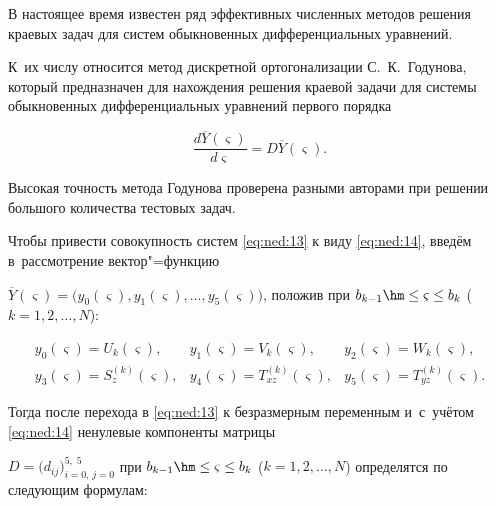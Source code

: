 \smallskip



В настоящее время известен ряд эффективных численных методов решения краевых задач для систем обыкновенных дифференциальных уравнений. 

К~их числу относится метод дискретной ортогонализации С.~К.~Годунова, который предназначен для нахождения решения краевой задачи для системы обыкновенных дифференциальных уравнений первого порядка

\begin{equation}

\frac{{d\overline Y (\varsigma)}}{{d\varsigma}}=D\overline Y(\varsigma).

\label{eq:ned:14}

\end{equation}

Высокая точность метода Годунова проверена разными авторами при решении большого количества тестовых задач.



Чтобы привести совокупность систем \eqref{eq:ned:13} к виду \eqref{eq:ned:14}, введём в~рассмотрение вектор"=функцию

$\overline Y(\varsigma)=\bigl( y_0(\varsigma), y_1(\varsigma), \dots, y_5(\varsigma) \bigr)$, положив при $b_{k-1}\hm\le\varsigma\le b_k$ ($k=1, 2, \dots, N$):

\begin{equation}

\begin{array}{lll}

y_0(\varsigma)=U_k(\varsigma),& y_1(\varsigma)=V_k(\varsigma), & y_2(\varsigma)=W_k(\varsigma),\\

y_3(\varsigma)=S_z^{(k)}(\varsigma), & y_4(\varsigma)=T_{xz}^{(k)}(\varsigma),& y_5(\varsigma)=T_{yz}^{(k)}(\varsigma).

\end{array}

\label{eq:ned:15}

\end{equation}

Тогда после перехода в \eqref{eq:ned:13} к безразмерным переменным и~с~учётом \eqref{eq:ned:14} ненулевые компоненты матрицы 

$ D=\bigl(d_{ij}\bigr)_{i=0,\, j=0}^{5,\; 5}$ при $b_{k-1}\hm\le\varsigma\le b_k$ ($k=1, 2, \dots, N$) определятся по следующим формулам:

